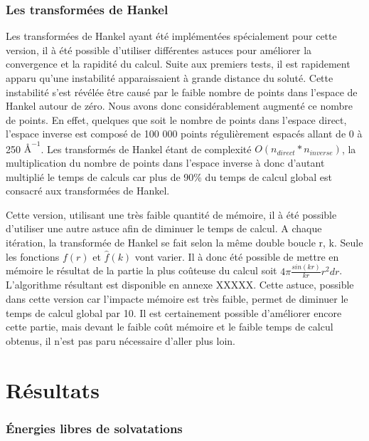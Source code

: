 \subsubsection{Les transformées de Hankel}
\label{sec:hankel_implementation}
Les transformées de Hankel ayant été implémentées spécialement pour cette version, il à été possible d'utiliser différentes astuces pour améliorer la convergence et la rapidité du calcul.
Suite aux premiers tests, il est rapidement apparu qu'une instabilité apparaissaient à grande distance du soluté. Cette instabilité s'est révélée être causé par le faible nombre de points dans l'espace de Hankel autour de zéro. Nous avons donc considérablement augmenté ce nombre de points. En effet, quelques que soit le nombre de points dans l'espace direct, l'espace inverse est composé de 100 000 points régulièrement espacés allant de 0 à 250 $\text{\AA}^{-1}$. Les transformés de Hankel étant de complexité $O(n_{direct}*n_{inverse})$,  la multiplication du nombre de points dans l'espace inverse à donc d'autant multiplié le temps de calculs car plus de 90\% du temps de calcul global est consacré aux transformées de Hankel.

Cette version, utilisant une très faible quantité de mémoire, il à été possible d'utiliser une autre astuce afin de diminuer le temps de calcul. A chaque itération, la transformée de Hankel se fait selon la même double boucle r, k. Seule les fonctions $f(r)$ et $\widehat{f}(k)$ vont varier. Il à donc été possible de mettre en mémoire le résultat de la partie la plus coûteuse du calcul soit $4\pi\frac{sin(kr)}{kr}r^2dr$. L'algorithme résultant est disponible en annexe XXXXX. Cette astuce, possible dans cette version car l'impacte mémoire est très faible, permet de diminuer le temps de calcul global par 10. Il est certainement possible d'améliorer encore cette partie, mais devant le faible coût mémoire et le faible temps de calcul obtenus, il n'est pas paru nécessaire d'aller plus loin.


\section{Résultats}
\subsubsection{\'Energies libres de solvatations}



